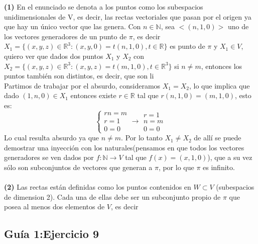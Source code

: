 \documentclass[a4paper]{article}
\begin{document}
\textbf{(1)} En el enunciado se denota a los puntos como los subespacios unidimensionales de V, es decir, las rectas vectoriales que pasan por el origen ya que hay un único vector que las genera. Con $n\in \mathbb{N}$, sea $<(n,1,0)>$ uno de los vectores generadores de un punto de $\pi$, es decir $X_1=\{(x,y,z) \in \mathbb{R}^3: (x,y,0)=t(n,1,0), t\in \mathbb{R}\}$ es punto de $\pi$ y $X_1\in V$, quiero ver que dados dos puntos $X_1$ y $X_2$ con $X_2=\{(x,y,z)\in \mathbb{R}^3 : (x,y,z)=t(m,1,0), t \in \mathbb{R}^3\}$ si $n\neq m$, entonces los puntos también son distintos, es decir, que son li\\
Partimos de trabajar por el absurdo, consideramos $X_1=X_2$, lo que implica que dado $(1,n,0)\in X_1$ entonces existe $r \in \mathbb{R}$ tal que $r(n,1,0)=(m,1,0)$, esto es:
\begin{equation}
    \left\{
    \begin{array}{l}
        rn=m\\
        r=1\\
        0=0
    \end{array}
    \rightarrow
    \begin{array}{l}
        r=1\\
        n=m\\
        0=0        
    \end{array}
    \right.
\end{equation} 
Lo cual resulta absurdo ya que $n\neq m$. Por lo tanto $X_1 \neq X_2$ de allí se puede demostrar una inyección con los naturales(pensamos en que todos los vectores generadores se ven dados por $f:\mathbb{N} \rightarrow V$ tal que $f(x)=(x,1,0)$), que a su vez sólo son subconjuntos de vectores que generan a $\pi$, por lo que $\pi$ es infinito.\\\\

\textbf{(2)} Las rectas están definidas como los puntos contenidos en $W\subset V$ (subespacios de dimension 2). Cada una de ellas debe ser un subconjunto propio de $\pi$ que posea al menos dos elementos de $V$, es decir 

\subsection{Guía 1:Ejercicio 9}
\end{document}
